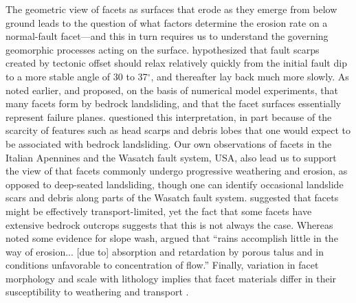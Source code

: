 The geometric view of facets as surfaces that erode as they emerge from below ground leads to the question of what factors determine the erosion rate on a normal-fault facet---and this in turn requires us to understand the governing geomorphic processes acting on the surface. \citet{wallace1978geometry} hypothesized that fault scarps created by tectonic offset should relax relatively quickly from the initial fault dip to a more stable angle of 30 to 37$^\circ$, and thereafter lay back much more slowly. As noted earlier, \citet{densmore1998landsliding} and \citet{ellis1999development} proposed, on the basis of numerical model experiments, that many facets form by bedrock landsliding, and that the facet surfaces essentially represent failure planes. \citet{petit2009faceted} questioned this interpretation, in part because of the scarcity of features such as head scarps and debris lobes that one would expect to be associated with bedrock landsliding. Our own observations of facets in the Italian Apennines and the Wasatch fault system, USA, also lead us to support the view of \citet{petit2009faceted} that facets commonly undergo progressive weathering and erosion, as opposed to deep-seated landsliding, though one can identify occasional landslide scars and debris along parts of the Wasatch fault system. \citet{menges1990soils} suggested that facets might be effectively transport-limited, yet the fact that some facets have extensive bedrock outcrops suggests that this is not always the case. Whereas \citet{menges1990soils} noted some evidence for slope wash, \citet{gilbert1928studies} argued that ``rains accomplish little in the way of erosion... [due to] absorption and retardation by porous talus and in conditions unfavorable to concentration of flow.'' Finally, variation in facet morphology and scale with lithology implies that facet materials differ in their susceptibility to weathering and transport \citep{menges1990soils,zuchiewicz2000geometry}. 

